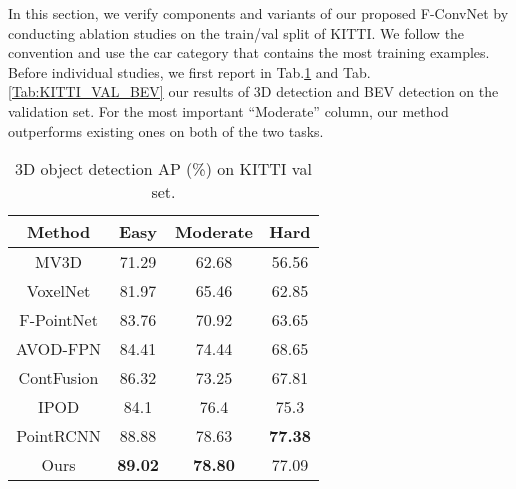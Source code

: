 \documentclass[letterpaper, 10 pt, conference]{ieeeconf}
\begin{document}
In this section, we verify components and variants of our proposed F-ConvNet by conducting ablation studies on the train/val split of KITTI. We follow the convention and use the car category that contains the most training examples. Before individual studies, we first report in Tab.\ref{Tab:KITTI_VAL_3D} and Tab.\ref{Tab:KITTI_VAL_BEV} our results of 3D detection and BEV detection on the validation set.
For the most important ``Moderate'' column, our method outperforms existing ones on both of the two tasks.
\begin{table}
	\begin{center}
		\begin{tabular}{c|ccc}
			\hline
			Method                            & Easy           & Moderate       & Hard           \\ \hline
			MV3D\cite{chen2017multi}          & 71.29          & 62.68          & 56.56          \\
			VoxelNet\cite{zhou2018voxelnet}   & 81.97          & 65.46          & 62.85          \\
			F-PointNet\cite{qi2018frustum}    & 83.76          & 70.92          & 63.65          \\
			AVOD-FPN\cite{ku2018joint}        & 84.41          & 74.44          & 68.65          \\
			ContFusion\cite{liang2018deep}    & 86.32          & 73.25          & 67.81          \\
			IPOD \cite{yang2018ipod}          & 84.1           & 76.4           & 75.3           \\
			PointRCNN \cite{shi2018pointrcnn} & 88.88          & 78.63          & \textbf{77.38} \\ \hline
			Ours                              & \textbf{89.02} & \textbf{78.80} & 77.09          \\ \hline
		\end{tabular}
		\caption{3D object detection AP (\%) on KITTI val set.}
		\label{Tab:KITTI_VAL_3D}
	\end{center}
	\vspace{-0.5cm}
\end{table}
\end{document}
